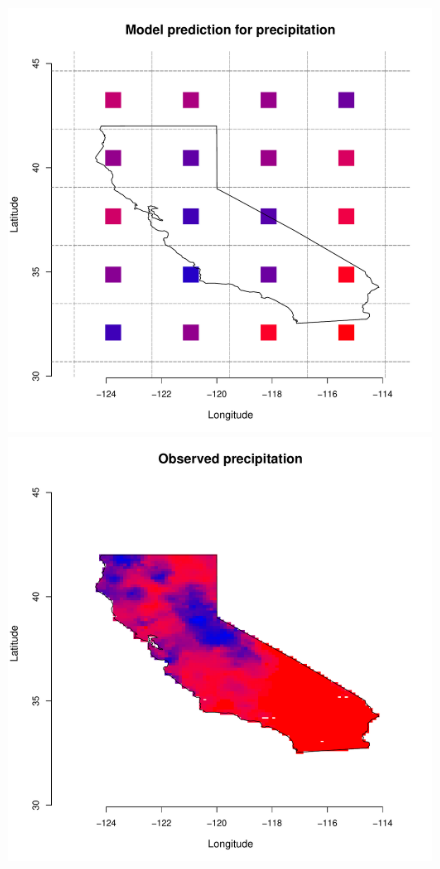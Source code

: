 \documentclass[12pt]{article}
\begin{document}
\begin{figure}
\begin{center}
\includegraphics[scale=0.26]{figs/cal_mod_box1.pdf}
\includegraphics[scale=0.26]{figs/cal_mod_box2.pdf}

\end{center}
\end{figure}
\end{document}
